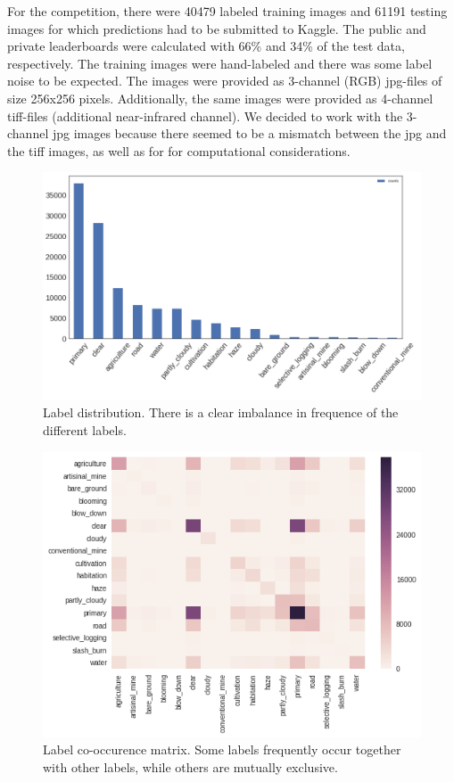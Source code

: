 \documentclass[fleqn]{homework}
\begin{document}
For the competition, there were 40479 labeled training images and 61191 testing images for which predictions had to be submitted to Kaggle. The public and private leaderboards were calculated with 66\% and 34\% of the test data, respectively. The training images were hand-labeled and there was some label noise to be expected. The images were provided as 3-channel (RGB) jpg-files of size 256x256 pixels. Additionally, the same images were provided as 4-channel tiff-files (additional near-infrared channel). We decided to work with the 3-channel jpg images because there seemed to be a mismatch between the jpg and the tiff images, as well as for for computational considerations.

\begin{figure}[H]
	\centering
     \includegraphics[width=0.7\linewidth]{figures/labels.png} 
	\caption{Label distribution. There is a clear imbalance in frequence of the different labels.}
	\label{labels} 
\end{figure}

\begin{figure}[H]
	\centering
     \includegraphics[width=0.7\linewidth]{figures/cooc1.png}
	\caption{Label co-occurence matrix. Some labels frequently occur together with other labels, while others are mutually exclusive. }
	\label{cooc} 
\end{figure}
\end{document}

